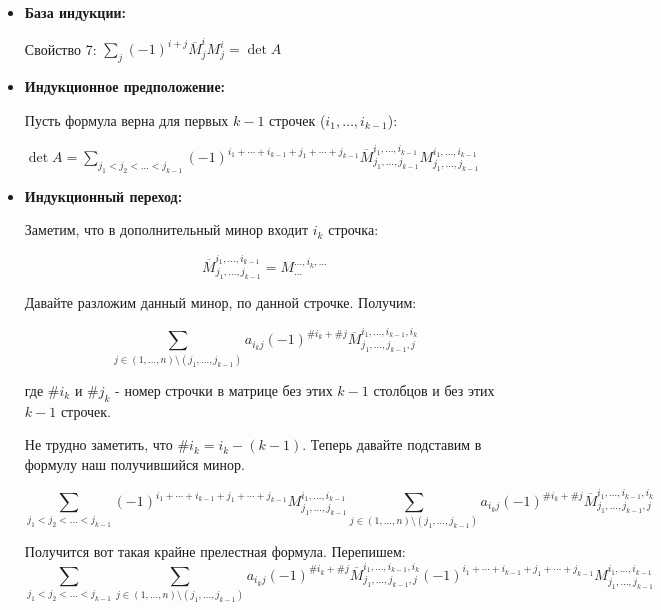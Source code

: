 \begin{itemize}
    \item \textbf{База индукции:}

          Свойство 7: \(\sum\limits_{j}(-1)^{i+j}\overline{M}_j^i M_j^i = \det A\)

    \item \textbf{Индукционное предположение:}

          Пусть формула верна для первых \(k-1\) строчек ($i_1,\ldots, i_{k-1}$):


          \(\det A = \sum\limits_{j_1<j_2<\ldots<j_{k-1}} (-1)^{i_1 + \cdots + i_{k-1}+j_1 + \cdots + j_{k-1}} \overline{M}_{j_1,\ldots, j_{k-1}}^{i_1,\ldots,i_{k-1}}M_{j_1,\ldots, j_{k-1}}^{i_1,\ldots,i_{k-1}}\)


    \item \textbf{Индукционный переход:}

          Заметим, что в дополнительный минор входит $i_k$ строчка:

          \[\overline{M}_{j_1, \ldots, j_{k - 1}}^{i_1, \ldots, i_{k - 1}} = M_{\ldots}^{\ldots, i_k, \ldots}\]

          Давайте разложим данный минор, по данной строчке. Получим:


          \[\sum\limits_{j \in (1, \ldots, n) \setminus (j_1, \ldots, j_{k-1})} a_{i_k j} (-1)^{\# i_k + \# j} \overline{M}_{j_1, \ldots, j_{k - 1},j}^{i_1, \ldots, i_{k - 1}, i_k}\]

          где $\#i_k$ и $\# j_k$ - номер строчки в матрице без этих $k-1$ столбцов и без этих $k-1$ строчек.


          Не трудно заметить, что \(\# i_k = i_k - (k - 1)\). Теперь давайте подставим в формулу наш получившийся минор.


          \small\[\sum\limits_{j_1<j_2<\ldots<j_{k-1}} (-1)^{i_1 + \cdots + i_{k-1}+j_1 + \cdots + j_{k-1}} M_{j_1,\ldots, j_{k-1}}^{i_1,\ldots,i_{k-1}} \sum\limits_{j \in (1, \ldots, n) \setminus (j_1, \ldots, j_{k-1})} a_{i_k j} (-1)^{\# i_k + \# j} \overline{M}_{j_1, \ldots, j_{k - 1},j}^{i_1, \ldots, i_{k - 1}, i_k}\]\normalsize

          Получится вот такая крайне прелестная формула. Перепишем:
          \small\[\sum\limits_{j_1<j_2<\ldots<j_{k-1}}  \sum\limits_{j \in (1, \ldots, n) \setminus (j_1, \ldots, j_{k-1})} a_{i_k j} (-1)^{\# i_k + \# j} \overline{M}_{j_1, \ldots, j_{k - 1},j}^{i_1, \ldots, i_{k - 1}, i_k} (-1)^{i_1 + \cdots + i_{k-1}+j_1 + \cdots + j_{k-1}} M_{j_1,\ldots, j_{k-1}}^{i_1,\ldots,i_{k-1}}\]\normalsize



\end{itemize}
